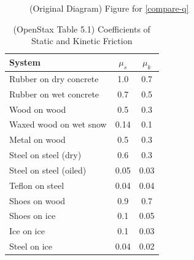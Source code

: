 \documentclass[10pt]{exam}
\begin{document}
\begin{questions}
\begin{enumerate}[resume*]
\begin{figure}[h]
      \caption{(Original Diagram) Figure for \ref{compare-q}}
      \label{compare-fig}
    \end{figure}

  \end{enumerate}

\pagebreak



  
  \begin{table}[h]
    \centering
    \begin{tabular}{lcc}
      \hline
      \textbf{System}        & $\mu_s$ & $\mu_k$ \\
      \hline
      Rubber on dry concrete   & 1.0   & 0.7   \\
      Rubber on wet concrete   & 0.7   & 0.5   \\
      Wood on wood             & 0.5   & 0.3   \\
      Waxed wood on wet snow   & 0.14  & 0.1   \\
      Metal on wood            & 0.5   & 0.3   \\
      Steel on steel (dry)     & 0.6   & 0.3   \\
      Steel on steel (oiled)   & 0.05  & 0.03  \\
      Teflon on steel          & 0.04  & 0.04  \\
      Shoes on wood            & 0.9   & 0.7   \\
      Shoes on ice             & 0.1   & 0.05  \\
      Ice on ice               & 0.1   & 0.03  \\
      Steel on ice             & 0.04  & 0.02  \\
      \hline\hline
    \end{tabular}
    \caption{(OpenStax Table 5.1) Coefficients of Static and Kinetic Friction}
    \label{mu}
  \end{table}


\end{questions}
\end{document}
